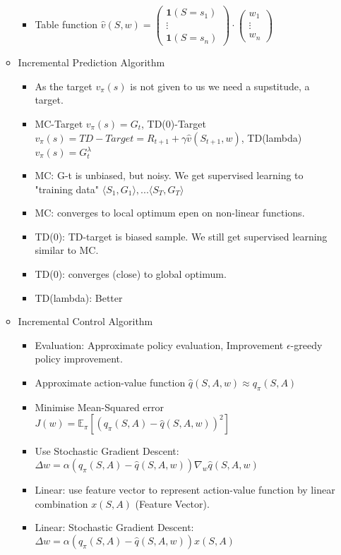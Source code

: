 \begin{itemize}
\begin{itemize}[noitemsep,nolistsep]
\begin{itemize}[noitemsep,nolistsep]
			\item Table function $\hat{v}(S,w) = \begin{pmatrix} \mathbf{1} (S = s_1)\\ \vdots \\ \mathbf{1} (S = s_n) \end{pmatrix} \cdot \begin{pmatrix} w_1\\ \vdots \\ w_n \end{pmatrix}$
		\end{itemize}
		\item Incremental Prediction Algorithm
		\begin{itemize}[noitemsep,nolistsep]
			\item As the target $v_\pi(s)$ is not given to us we need a supstitude, a target.
			\item MC-Target $v_\pi(s) = G_t$, TD(0)-Target $v_\pi(s) = TD-Target = R_{t+1} + \gamma \hat{v}(S_{t+1},w)$, TD(lambda) $v_\pi(s) = G_t^\lambda$
			\item MC: G-t is unbiased, but noisy. We get supervised learning to "training data" $\langle S_1,G_1 \rangle, ... \langle S_T,G_T \rangle$
			\item MC: converges to local optimum epen on non-linear functions.
			\item TD(0): TD-target is biased sample. We still get supervised learning similar to MC.
			\item TD(0): converges (close) to global optimum.
			\item TD(lambda): Better
		\end{itemize}
		\item Incremental Control Algorithm
		\begin{itemize}[noitemsep,nolistsep]
			\item Evaluation: Approximate policy evaluation, Improvement $\epsilon$-greedy policy improvement.
			\item Approximate action-value function $\hat{q}(S,A,w) \approx q_\pi(S,A)$
			\item Minimise Mean-Squared error $J(w) = \mathbb{E}_\pi [(q_\pi(S,A) - \hat{q}(S,A,w))^2]$
			\item Use Stochastic Gradient Descent: $\Delta w = \alpha(q_\pi(S,A) - \hat{q}(S,A,w)) \nabla_w \hat{q}(S,A,w)$
			\item Linear: use feature vector to represent action-value function by linear combination $x(S,A)$ (Feature Vector).
			\item Linear: Stochastic Gradient Descent: $\Delta w = \alpha(q_\pi(S,A) - \hat{q}(S,A,w)) x(S,A)$

\end{itemize}
\end{itemize}
\end{itemize}
